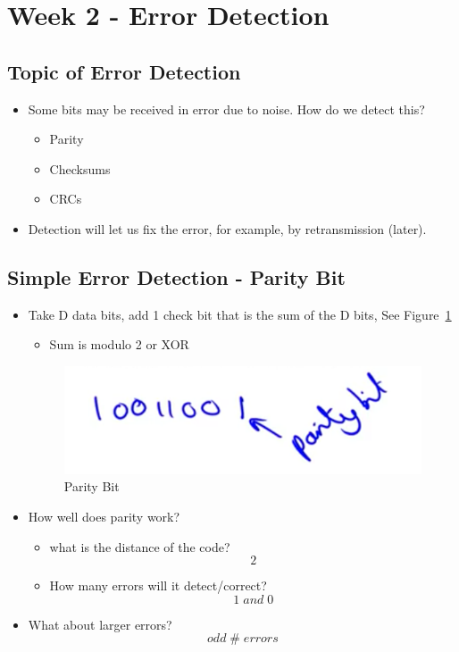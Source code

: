\documentclass[12pt]{ctexart}   %
\begin{document}
\section{Week 2 - Error Detection}
	\subsection{Topic of Error Detection}
	\begin{itemize}
		\item Some bits may be received in error due to noise. How do we detect this?
		\begin{itemize}
			\item Parity
			\item Checksums
			\item CRCs
		\end{itemize}
		
		\item Detection will let us fix the error, for example, by retransmission (later).
	\end{itemize}
	
	\subsection{Simple Error Detection - Parity Bit}
	\begin{itemize}
		\item Take D data bits, add 1 check bit that is the sum of the D bits, See Figure~\ref{fig:2-9-1}
		\begin{itemize}
			\item Sum is modulo 2 or XOR
		\end{itemize}
		
		\begin{figure}[h!] %
		\centering
		 \includegraphics[scale=0.7]{images/2-9-1}
		\caption{Parity Bit}
		 \label{fig:2-9-1}
		 \end{figure}
		 
		 \item How well does parity work?
		 \begin{itemize}
		 	\item what is the distance of the code?
		 	$$
		 	2
		 	$$
		 	\item How many errors will it detect/correct?
		 	$$
		 	1 \; and \; 0
		 	$$
		 \end{itemize}
		
		\item What about larger errors?
		$$
		odd \; \# \; errors
		$$
	\end{itemize}
	
\end{document}
